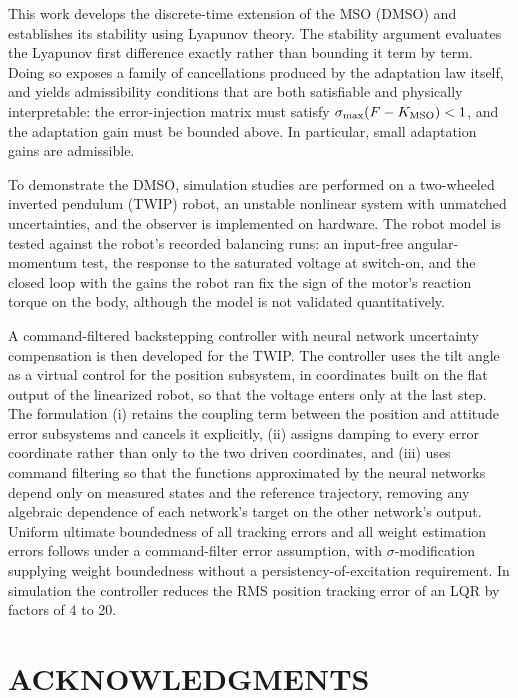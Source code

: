 This work develops the discrete-time extension of the MSO (DMSO) and establishes
its stability using Lyapunov theory. The stability argument evaluates the
Lyapunov first difference exactly rather than bounding it term by term. Doing so
exposes a family of cancellations produced by the adaptation law itself, and
yields admissibility conditions that are both satisfiable and physically
interpretable: the error-injection matrix must satisfy $\sigma_{\max}(F-K_{\mathrm{MSO}})<1$, and
the adaptation gain must be bounded above. In particular, small adaptation gains
are admissible.

To demonstrate the DMSO, simulation studies are performed on a two-wheeled
inverted pendulum (TWIP) robot, an unstable nonlinear system with unmatched
uncertainties, and the observer is implemented on hardware. The robot model is
tested against the robot's recorded balancing runs: an input-free
angular-momentum test, the response to the saturated voltage at switch-on, and
the closed loop with the gains the robot ran fix the sign of the motor's
reaction torque on the body, although the model is not validated
quantitatively.

A command-filtered backstepping controller with neural network uncertainty
compensation is then developed for the TWIP. The controller uses the tilt angle
as a virtual control for the position subsystem, in coordinates built on the
flat output of the linearized robot, so that the voltage enters only at the
last step. The formulation (i) retains the coupling term between the position
and attitude error subsystems and cancels it explicitly, (ii) assigns damping to
every error coordinate rather than only to the two driven coordinates, and (iii)
uses command filtering so that the functions approximated by the neural networks
depend only on measured states and the reference trajectory, removing any
algebraic dependence of each network's target on the other network's output.
Uniform ultimate boundedness of all tracking errors and all weight estimation
errors follows under a command-filter error assumption, with
$\sigma$-modification supplying weight boundedness without a
persistency-of-excitation requirement. In simulation the controller reduces the
RMS position tracking error of an LQR by factors of 4 to 20.

\clearpage

\chapter*{ACKNOWLEDGMENTS}

